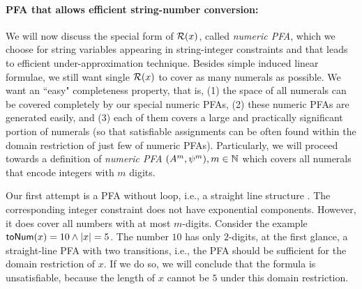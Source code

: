 \documentclass[sigplan,review,anonymous]{acmart}\settopmatter{printfolios=true,printccs=false,printacmref=false}
\begin{document}
\paragraph{PFA that allows efficient string-number conversion: } 
We will now discuss the special form of $\mathcal{R}(x)$, called \emph{numeric PFA}, which we choose for string variables appearing in string-integer constraints and that leads to efficient under-approximation technique.
%
Besides simple induced linear formulae, we still want single $\mathcal{R}(x)$ to cover as many numerals as possible.
We want an ``easy" completeness property, that is,  (1) the space of all numerals can be covered completely by our special numeric PFAs, (2) these numeric PFAs are generated easily, and (3) each of them covers a large and practically significant portion of numerals (so that satisfiable assignments can be often found within the domain restriction of just few of numeric PFAs).
%
Particularly, we will proceed towards a definition of \emph{numeric PFA} $(A^m,\psi^m),m\in\mathbb{N}$ which covers all numerals that encode integers with $m$ digits.

Our first attempt is a PFA without loop, i.e., a straight line structure 
. The corresponding integer constraint does not have exponential components. However, it does cover all numbers with at most $m$-digits. Consider the example $\mbox{\textsf{toNum}($x$)}=10 \wedge |x|=5$. The number $10$ has only $2$-digits, at the first glance, a straight-line PFA with two transitions, i.e., the PFA
     should be sufficient for the domain restriction of $x$. If we do so, we will conclude that the formula is unsatisfiable, because the length of $x$ cannot be $5$  under this domain restriction.
\end{document}
